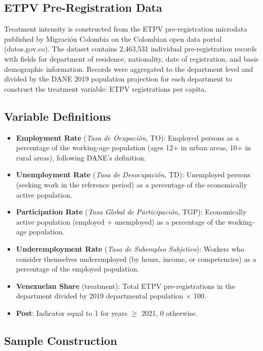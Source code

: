 \documentclass[12pt]{article}
\begin{document}
\subsection{ETPV Pre-Registration Data}

Treatment intensity is constructed from the ETPV pre-registration microdata published by Migraci\'on Colombia on the Colombian open data portal (datos.gov.co). The dataset contains 2,463,531 individual pre-registration records with fields for department of residence, nationality, date of registration, and basic demographic information. Records were aggregated to the department level and divided by the DANE 2019 population projection for each department to construct the treatment variable: ETPV registrations per capita.

\subsection{Variable Definitions}

\begin{itemize}
\item \textbf{Employment Rate} (\textit{Tasa de Ocupaci\'on}, TO): Employed persons as a percentage of the working-age population (ages 12+ in urban areas, 10+ in rural areas), following DANE's definition.
\item \textbf{Unemployment Rate} (\textit{Tasa de Desocupaci\'on}, TD): Unemployed persons (seeking work in the reference period) as a percentage of the economically active population.
\item \textbf{Participation Rate} (\textit{Tasa Global de Participaci\'on}, TGP): Economically active population (employed + unemployed) as a percentage of the working-age population.
\item \textbf{Underemployment Rate} (\textit{Tasa de Subempleo Subjetivo}): Workers who consider themselves underemployed (by hours, income, or competencies) as a percentage of the employed population.
\item \textbf{Venezuelan Share} (treatment): Total ETPV pre-registrations in the department divided by 2019 departmental population $\times$ 100.
\item \textbf{Post}: Indicator equal to 1 for years $\geq$ 2021, 0 otherwise.
\end{itemize}

\subsection{Sample Construction}
\end{document}
